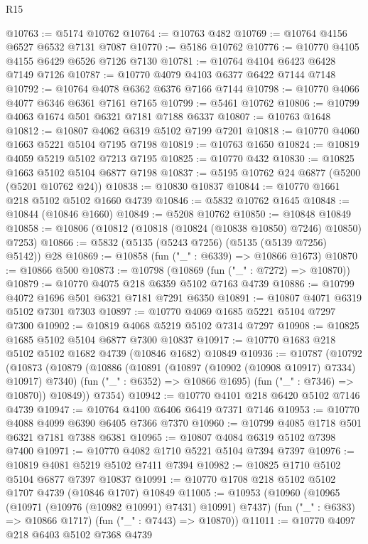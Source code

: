 \begin{lexlean}{R15}
\begin{coremodule}
{{{{{{{{{{{@10763 := @5174 @10762
@10764 := @10763 @482
@10769 := @10764 @4156 @6527 @6532 @7131 @7087
@10770 := @5186 @10762
@10776 := @10770 @4105 @4155 @6429 @6526 @7126 @7130
@10781 := @10764 @4104 @6423 @6428 @7149 @7126
@10787 := @10770 @4079 @4103 @6377 @6422 @7144 @7148
@10792 := @10764 @4078 @6362 @6376 @7166 @7144
@10798 := @10770 @4066 @4077 @6346 @6361 @7161 @7165
@10799 := @5461 @10762
@10806 := @10799 @4063 @1674 @501 @6321 @7181 @7188 @6337
@10807 := @10763 @1648
@10812 := @10807 @4062 @6319 @5102 @7199 @7201
@10818 := @10770 @4060 @1663 @5221 @5104 @7195 @7198
@10819 := @10763 @1650
@10824 := @10819 @4059 @5219 @5102 @7213 @7195
@10825 := @10770 @432
@10830 := @10825 @1663 @5102 @5104 @6877 @7198
@10837 := @5195 @10762 @24 @6877 (@5200 (@5201 @10762 @24))
@10838 := @10830 @10837
@10844 := @10770 @1661 @218 @5102 @5102 @1660 @4739
@10846 := @5832 @10762 @1645
@10848 := @10844 (@10846 @1660)
@10849 := @5208 @10762
@10850 := @10848 @10849
@10858 := @10806 (@10812 (@10818 (@10824 (@10838 @10850) @7246) @10850) @7253)
@10866 := @5832 (@5135 (@5243 @7256) (@5135 (@5139 @7256) @5142)) @28
@10869 := @10858 (fun ("_" : @6339) => @10866 @1673)
@10870 := @10866 @500
@10873 := @10798 (@10869 (fun ("_" : @7272) => @10870))
@10879 := @10770 @4075 @218 @6359 @5102 @7163 @4739
@10886 := @10799 @4072 @1696 @501 @6321 @7181 @7291 @6350
@10891 := @10807 @4071 @6319 @5102 @7301 @7303
@10897 := @10770 @4069 @1685 @5221 @5104 @7297 @7300
@10902 := @10819 @4068 @5219 @5102 @7314 @7297
@10908 := @10825 @1685 @5102 @5104 @6877 @7300 @10837
@10917 := @10770 @1683 @218 @5102 @5102 @1682 @4739 (@10846 @1682) @10849
@10936 := @10787
    (@10792
      (@10873
        (@10879
          (@10886
            (@10891 (@10897 (@10902 (@10908 @10917) @7334) @10917) @7340)
            (fun ("_" : @6352) => @10866 @1695)
            (fun ("_" : @7346) => @10870))
          @10849))
      @7354)
@10942 := @10770 @4101 @218 @6420 @5102 @7146 @4739
@10947 := @10764 @4100 @6406 @6419 @7371 @7146
@10953 := @10770 @4088 @4099 @6390 @6405 @7366 @7370
@10960 := @10799 @4085 @1718 @501 @6321 @7181 @7388 @6381
@10965 := @10807 @4084 @6319 @5102 @7398 @7400
@10971 := @10770 @4082 @1710 @5221 @5104 @7394 @7397
@10976 := @10819 @4081 @5219 @5102 @7411 @7394
@10982 := @10825 @1710 @5102 @5104 @6877 @7397 @10837
@10991 := @10770 @1708 @218 @5102 @5102 @1707 @4739 (@10846 @1707) @10849
@11005 := @10953
    (@10960
      (@10965 (@10971 (@10976 (@10982 @10991) @7431) @10991) @7437)
      (fun ("_" : @6383) => @10866 @1717)
      (fun ("_" : @7443) => @10870))
@11011 := @10770 @4097 @218 @6403 @5102 @7368 @4739
}}}}}}}}}}}
\end{coremodule}
\end{lexlean}
